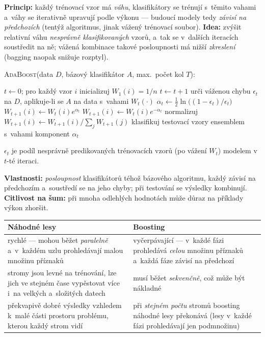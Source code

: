 \documentclass[11pt,a4paper]{article}
\theoremstyle{definition}
\begin{document}
\begin{defbox}
\textbf{Princip:} každý trénovací vzor má \emph{váhu}, klasifikátory se trénují s~těmito vahami
a~váhy se iterativně upravují podle výkonu --- budoucí modely tedy \emph{závisí na předchozích}
(tentýž algoritmus, jinak vážený trénovací soubor). \textbf{Idea:} zvýšit relativní váhu
\emph{nesprávně klasifikovaných} vzorů, a~tak se v~dalších iteracích soustředit na ně; vážená
kombinace takové posloupnosti má nižší \emph{zkreslení} (bagging naopak snižuje rozptyl).

\textsc{AdaBoost}(data $D$, bázový klasifikátor $A$, max.\ počet kol $T$):
\begin{algorithmic}[1]
\State $t\gets 0$; pro každý vzor $i$ inicializuj $W_1(i)=1/n$
\Repeat
  \State $t\gets t+1$
  \State urči váženou chybu $\epsilon_t$ na $D$, aplikuje-li se $A$ na data s~vahami
         $W_t(\cdot)$
  \State $\alpha_t\gets \tfrac12\ln\big((1-\epsilon_t)/\epsilon_t\big)$
     \State $W_{t+1}(i)\gets W_t(i)e^{\alpha_t}$
  \EndFor
     \State $W_{t+1}(i)\gets W_t(i)e^{-\alpha_t}$
  \EndFor
  \State normalizuj $W_{t+1}(i)\gets W_{t+1}(i)/\sum_j W_{t+1}(j)$
\State klasifikuj testovací vzory ensemblem s~vahami komponent $\alpha_t$
\end{algorithmic}
$\epsilon_t$ je podíl nesprávně predikovaných trénovacích vzorů (po vážení $W_t$) modelem
v~$t$-té iteraci.

\textbf{Vlastnosti:} \emph{posloupnost} klasifikátorů téhož bázového algoritmu, každý závisí na
předchozím a~soustředí se na jeho chyby; při testování se výsledky kombinují. \textbf{Citlivost
na šum:} při mnoha odlehlých hodnotách může důraz na  příklady výkon zhoršit.
\end{defbox}

\begin{center}
\small
\begin{tabular}{@{}p{7.6cm}p{8.0cm}@{}}
\toprule
\textbf{Náhodné lesy} & \textbf{Boosting} \\
\midrule
rychlé --- mohou běžet \emph{paralelně} a~v~každém uzlu prohledávají malou množinu příznaků
  & vyčerpávající --- v~každé fázi prohledává \emph{celou} množinu příznaků a~každá fáze
  závisí na předchozí \\
stromy jsou levné na trénování, lze jich ve stejném čase vypěstovat více i~na velkých
  a~složitých datech & musí běžet \emph{sekvenčně}, což může být nákladné \\
překvapivě dobré výsledky vzhledem k~malé části prostoru problému, kterou každý strom vidí
  & při \emph{stejném počtu} stromů boosting náhodné lesy překonává (lesy v~každé fázi
  prohledávají jen podmnožinu) \\
\bottomrule
\end{tabular}
\end{center}
\end{document}
